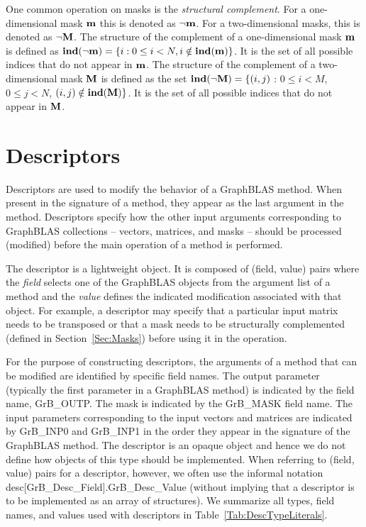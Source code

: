 One common operation on masks is the \emph{structural complement}.
For a one-dimensional mask ${\bf m}$ this is denoted as
$\neg{\bf m}$. For a two-dimensional masks, this is denoted as
$\neg{\bf M}$.  The structure of the complement of a one-dimensional
mask ${\bf m}$ is defined as $\mathbf{ind}(\neg{\bf m}) = \{i : 0
\leq i < N, i \notin \mathbf{ind}({\bf m}) \}$.  It is the set of all
possible indices that do not appear in ${\bf m}$.  The structure
of the complement of a two-dimensional mask ${\bf M}$ is defined as the set
$\mathbf{ind}(\neg{\bf M}) = \{(i,j)$ : $0 \leq i < M$, $0 \leq j < N$,
$(i,j) \notin \mathbf{ind}({\bf M}) \}$.  It is the set of all possible
indices that do not appear in ${\bf M}$.

\section{Descriptors}
\label{Sec:Descriptors}

Descriptors are used to modify the behavior of a GraphBLAS method.
When present in the signature of a method, they appear as the last
argument in the method.  Descriptors specify how the other input arguments
corresponding to GraphBLAS collections -- vectors, matrices, and masks
-- should be processed (modified) before the main operation of a method
is performed.

The descriptor is a lightweight object.  It is composed of (field,
value) pairs where the \emph{field} selects one of the GraphBLAS objects
from the argument list of a method and the \emph{value} defines the
indicated modification associated with that object.  For example,
a descriptor may specify that a particular input matrix needs to be
transposed or that a mask needs to be structurally complemented (defined
in Section~\ref{Sec:Masks}) before using it in the operation.

For the purpose of constructing descriptors, the arguments of a method
that can be modified are identified by specific field names. The output
parameter (typically the first parameter in a GraphBLAS method) is
indicated by the field name, {\sf GrB\_OUTP}.  The mask is indicated
by the {\sf GrB\_MASK} field name. The input parameters corresponding
to the input vectors and matrices are indicated by {\sf GrB\_INP0}
and {\sf GrB\_INP1} in the order they appear in the signature of the
GraphBLAS method.  The descriptor is an opaque object and hence we do not
define how objects of this type should be implemented.   When referring to
(field, value) pairs for a descriptor, however, we often use the informal
notation {\sf desc[GrB\_Desc\_Field].GrB\_Desc\_Value} (without implying
that a descriptor is to be implemented as an array of structures).
We summarize all types, field names, and values used with descriptors
in Table~\ref{Tab:DescTypeLiterals}.

